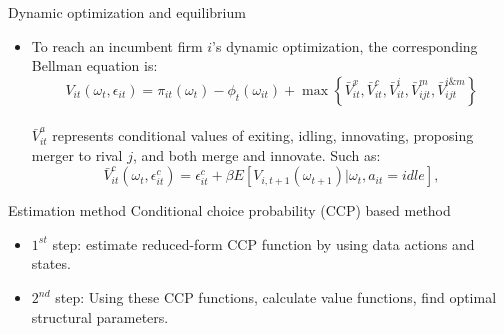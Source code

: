 \documentclass[aspectratio=169]{beamer}  %
\begin{document}
\begin{frame}{Dynamic optimization and equilibrium}
    \begin{itemize}
    \item To reach an incumbent firm $i$'s dynamic optimization, the corresponding Bellman equation is:
    \begin{equation*}
        V_{it} (\omega_t, \epsilon_{it}) = \pi_{it} (\omega_t) - \phi_t (\omega_{it}) + \max \left\{ \bar V^x_{it}, \bar V^c_{it}, \bar V^i_{it}, \bar V^m_{ijt},  {\bar V^{i\&m}_{ijt}} \right\}
    \end{equation*} \\
    $\bar V_{it}^a$ represents conditional values of exiting, idling, innovating, proposing merger to rival $j$, and both merge and innovate. Such as: \\
    \begin{equation*}
        \bar {V}^c_{it} (\omega_t, \epsilon^c_{it}) =  \epsilon^c_{it} + \beta E \left[ V_{i,t+1} (\omega_{t+1}) | \omega_t, a_{it} = idle \right],
    \end{equation*}
    
    \end{itemize}
\end{frame}

\begin{frame}{Estimation method}
    Conditional choice probability (CCP) based method
    \begin{itemize}
    \item $1^{st}$ step: estimate reduced-form CCP function  by using data actions and states.
    \item $2^{nd}$ step: Using these CCP functions, calculate value functions, find optimal structural parameters.
    
    \end{itemize}
\end{frame}

\end{document}
